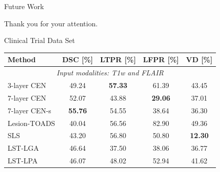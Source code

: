 \documentclass{beamer}
\begin{document}
\begin{frame}{Future Work}
\begin{center}
%
%
\end{center}
\end{frame}

\begin{questionmarks}
\begin{frame}
\centering
\Large Thank you for your attention.
\end{frame}
\end{questionmarks}

\appendix

\begin{frame}{Clinical Trial Data Set}
\begin{center}
\begin{tabular}{@{}lcccc@{}}
\toprule
Method & DSC [\%] & LTPR [\%] & LFPR [\%] & VD [\%] \\
\midrule
\multicolumn{5}{c}{\textit{Input modalities: T1w and FLAIR}} \\
\midrule
3-layer CEN & 49.24 & \bfseries 57.33 & 61.39 & 43.45 \\
7-layer CEN & 52.07 & 43.88 & \bfseries 29.06 & 37.01 \\ 
7-layer CEN-s & \bfseries 55.76 & 54.55 & 38.64 & 36.30 \\[0.2em]
Lesion-TOADS & 40.04 & 56.56 & 82.90 & 49.36 \\ 
SLS & 43.20 &  56.80 & 50.80 & \bfseries 12.30 \\
LST-LGA & 46.64 & 37.50 & 38.06 & 36.77 \\
LST-LPA & 46.07 & 48.02 & 52.94 & 41.62 \\
\bottomrule
\end{tabular}
\end{center}
\end{frame}
\end{document}
